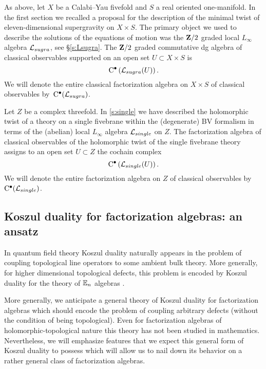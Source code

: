 As above, let $X$ be a Calabi--Yau fivefold and $S$ a real oriented one-manifold. 
In the first section we recalled a proposal for the description of the minimal twist of eleven-dimensional supergravity on $X \times S$. 
The primary object we used to describe the solutions of the equations of motion was the $\mathbf{Z}/2$ graded local $L_\infty$ algebra $\mathcal L_{sugra}$, see \S \ref{s:Lsugra}. 
The $\mathbf{Z}/2$ graded commutative dg algebra of classical observables supported on an open set $U \subset X \times S$ is 
\[
{\rm C}^\bullet\left(\mathcal L_{sugra}(U)\right) .
\]
We will denote the entire classical factorization algebra on $X \times S$ of classical observables by~${\rm C}^\bullet(\mathcal L_{sugra})$.

\parsec[s:membraneobs]


\parsec[s:fivebraneobs]

Let $Z$ be a complex threefold. 
In \ref{s:single} we have described the holomorphic twist of a theory on a single fivebrane within the (degenerate) BV formalism in terms of the (abelian) local $L_\infty$ algebra $\mathcal L_{single}$ on $Z$. 
The factorization algebra of classical observables of the holomorphic twist of the single fivebrane theory assigns to an open set $U \subset Z$
the cochain complex
\[
{\rm C}^\bullet\left(\mathcal L_{single}(U)\right) .
\]
We will denote the entire factorization algebra on $Z$ of classical observables by~${\rm C}^\bullet(\mathcal L_{single})$.

\subsection{Koszul duality for factorization algebras: an ansatz} 

In quantum field theory Koszul duality naturally appears in the problem of coupling topological line operators to some ambient bulk theory. 
More generally, for higher dimensional topological defects, this problem is encoded by Koszul duality for the theory of $\mathbb E_n$ algebras \cite{??}.

More generally, we anticipate a general theory of Koszul duality for factorization algebras which should encode the problem of coupling arbitrary defects (without the condition of being topological).
Even for factorization algebras of holomorphic-topological nature this theory has not been studied in mathematics. 
Nevertheless, we will emphasize features that we expect this general form of Koszul duality to possess which will allow us to nail down its behavior on a rather general class of factorization algebras. 

